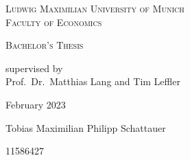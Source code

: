 \begin{titlepage}
    \vspace*{\fill}
    \centering

    \textsc{\Large Ludwig Maximilian University of Munich}\\
    \textsc{Faculty of Economics}


    \vspace{4cm}

    \begin{doublespace}
        \makeatletter
        \textsc{ \Huge \@title}
        \textsc{\Large \@subtitle}
        \makeatother
    \end{doublespace}


    \vspace{3cm}
    \huge \textsc{Bachelor's Thesis}



    \vspace{0.3cm}
    \large \textrm{supervised by\\Prof.~Dr.~Matthias Lang and Tim Leffler}

    \vspace{2cm}
    \huge
    \textrm{February 2023}

    \vspace{2cm}
    \Large{\textrm{Tobias Maximilian Philipp Schattauer}}

    11586427

    \vspace*{\fill}
\end{titlepage}





